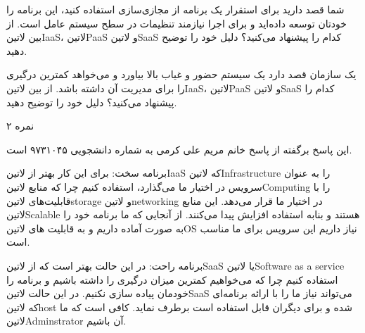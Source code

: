 \documentclass[../main.tex]{subfiles}
\begin{document}

شما قصد دارید برای استقرار یک برنامه از مجازی‌سازی استفاده کنید، این برنامه را خودتان توسعه داده‌اید و برای اجرا نیازمند تنظیمات در سطح سیستم عامل است.
از بین ‌لاتین{IaaS}، ‌لاتین{PaaS} و ‌لاتین{SaaS} کدام را پیشنهاد می‌کنید؟ دلیل خود را توضیح دهید.

یک سازمان قصد دارد یک سیستم حضور و غیاب بالا بیاورد و می‌خواهد کمترین درگیری را برای مدیریت آن داشته باشد.
از بین ‌لاتین{IaaS}، ‌لاتین{PaaS} و ‌لاتین{SaaS} کدام را پیشنهاد می‌کنید؟ دلیل خود را توضیح دهید.

۲ نمره

\begin{answer}

این پاسخ برگفته از پاسخ خانم مریم علی کرمی به شماره دانشجویی ۹۷۳۱۰۴۵ است.

برنامه سخت: برای این کار بهتر از ‌لاتین{IaaS} که ‌لاتین{Infrastructure} را به عنوان سرویس در اختیار ما می‌گذارد، استفاده کنیم
چرا که منابع ‌لاتین{Computing} را با قابلیت‌های ‌لاتین{storage} و ‌لاتین{networking} در اختیار ما قرار می‌دهد.
این منابع ‌لاتین{Scalable} هستند و بنابه استفاده افزایش پیدا می‌کنند.
از آنجایی که ما برنامه خود را به صورت آماده داریم و به قابلیت های ‌لاتین{OS} نیاز داریم این سرویس برای ما مناسب است.

برنامه راحت: در این حالت بهتر است که از ‌لاتین{SaaS} یا ‌لاتین{Software as a service} استفاده کنیم چرا که می‌خواهیم
کمترین میزان درگیری را داشته باشیم و برنامه را خودمان پیاده سازی نکنیم.
در این حالت ‌لاتین{SaaS} می‌تواند نیاز ما را با ارائه برنامه‌ای که
‌لاتین{host} شده و برای دیگران قابل استفاده است برطرف نماید. کافی است که ما ‌لاتین{Adminstrator} آن
باشیم.

\end{answer}
\end{document}

